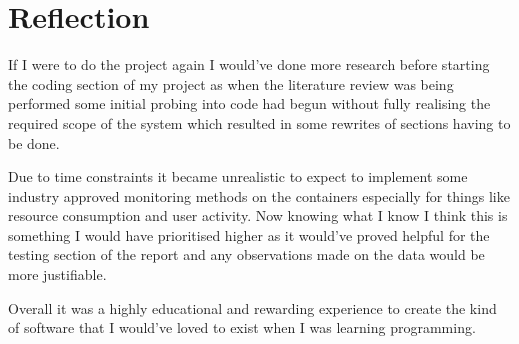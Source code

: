 \documentclass[12pt, a4paper]{extreport}
\begin{document}
\pagebreak

\chapter{Reflection}

If I were to do the project again I would've done more research before starting the coding section of my project as when the literature review was being performed some initial probing into code had begun without fully realising the required scope of the system which resulted in some rewrites of sections having to be done.

Due to time constraints it became unrealistic to expect to implement some industry approved monitoring methods on the containers especially for things like resource consumption and user activity. Now knowing what I know I think this is something I would have prioritised higher as it would've proved helpful for the testing section of the report and any observations made on the data would be more justifiable.

Overall it was a highly educational and rewarding experience to create the kind of software that I would've loved to exist when I was learning programming.

\printbibliography

\pagebreak



\end{document}
